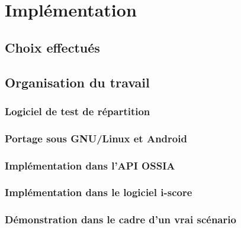 \chapter{Implémentation}
\section{Choix effectués}
\section{Organisation du travail}

\subsection{Logiciel de test de répartition}
\subsection{Portage sous GNU/Linux et Android}
\subsection{Implémentation dans l'API OSSIA} 
\subsection{Implémentation dans le logiciel i-score}
\subsection{Démonstration dans le cadre d'un vrai scénario}
